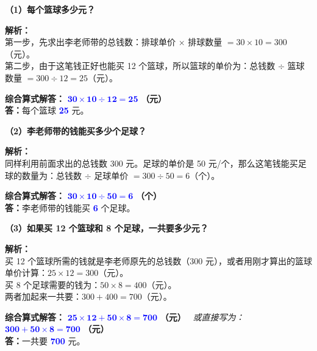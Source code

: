 \noindent\textbf{（1）每个篮球多少元？}

\vspace{0.2cm}

{\small\color{gray}
\textbf{解析：}\\
第一步，先求出李老师带的总钱数：排球单价 $\times$ 排球数量 $= 30 \times 10 = 300$（元）。\\
第二步，由于这笔钱正好也能买 12 个篮球，所以篮球的单价为：总钱数 $\div$ 篮球数量 $= 300 \div 12 = 25$（元）。
}

\vspace{0.2cm}
\noindent\textbf{综合算式解答：} \textbf{\textcolor{blue}{$\boldsymbol{30 \times 10 \div 12 = 25}$}} \textbf{（元）} \\
\noindent\textbf{答：}每个篮球 \textbf{\textcolor{blue}{25}} 元。

\vspace{0.6cm}

\noindent\textbf{（2）李老师带的钱能买多少个足球？}

\vspace{0.2cm}

{\small\color{gray}
\textbf{解析：}\\
同样利用前面求出的总钱数 300 元。足球的单价是 50 元/个，那么这笔钱能买足球的数量为：总钱数 $\div$ 足球单价 $= 300 \div 50 = 6$（个）。
}

\vspace{0.2cm}
\noindent\textbf{综合算式解答：} \textbf{\textcolor{blue}{$\boldsymbol{30 \times 10 \div 50 = 6}$}} \textbf{（个）} \\
\noindent\textbf{答：}李老师带的钱能买 \textbf{\textcolor{blue}{6}} 个足球。

\vspace{0.6cm}

\noindent\textbf{（3）如果买 12 个篮球和 8 个足球，一共要多少元？}

\vspace{0.2cm}

{\small\color{gray}
\textbf{解析：}\\
买 12 个篮球所需的钱就是李老师原先的总钱数（$300$ 元），或者用刚才算出的篮球单价计算：$25 \times 12 = 300$（元）。\\
买 8 个足球需要的钱为：$50 \times 8 = 400$（元）。\\
两者加起来一共要：$300 + 400 = 700$（元）。
}

\vspace{0.2cm}
\noindent\textbf{综合算式解答：} \textbf{\textcolor{blue}{$\boldsymbol{25 \times 12 + 50 \times 8 = 700}$}} \textbf{（元）} \ \textit{或直接写为：} \textbf{\textcolor{blue}{$\boldsymbol{300 + 50 \times 8 = 700}$}} \textbf{（元）}\\
\noindent\textbf{答：}一共要 \textbf{\textcolor{blue}{700}} 元。


